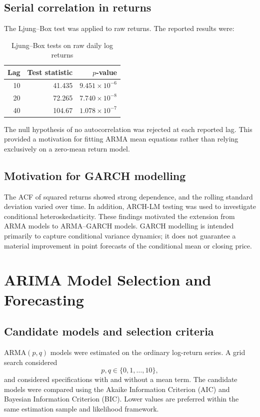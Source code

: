 \documentclass[10pt,a4paper]{article}
\begin{document}
\subsection{Serial correlation in returns}

The Ljung--Box test was applied to raw returns. The reported results were:
\begin{table}[H]
\centering
\caption{Ljung--Box tests on raw daily log returns}
\begin{tabular}{rrr}
\toprule
Lag & Test statistic & $p$-value \\
\midrule
10 & 41.435 & $9.451\times 10^{-6}$ \\
20 & 72.265 & $7.740\times 10^{-8}$ \\
40 & 104.67 & $1.078\times 10^{-7}$ \\
\bottomrule
\end{tabular}
\label{tab:raw_lb}
\end{table}

The null hypothesis of no autocorrelation was rejected at each reported lag. This provided a motivation for fitting ARMA mean equations rather than relying exclusively on a zero-mean return model.

\subsection{Motivation for GARCH modelling}

The ACF of squared returns showed strong dependence, and the rolling standard deviation varied over time. In addition, ARCH-LM testing was used to investigate conditional heteroskedasticity. These findings motivated the extension from ARMA models to ARMA--GARCH models. GARCH modelling is intended primarily to capture conditional variance dynamics; it does not guarantee a material improvement in point forecasts of the conditional mean or closing price.

\section{ARIMA Model Selection and Forecasting}

\subsection{Candidate models and selection criteria}

ARMA$(p,q)$ models were estimated on the ordinary log-return series. A grid search considered
\begin{equation}
  p,q\in\{0,1,\ldots,10\},
\end{equation}
and considered specifications with and without a mean term. The candidate models were compared using the Akaike Information Criterion (AIC) and Bayesian Information Criterion (BIC). Lower values are preferred within the same estimation sample and likelihood framework.
\end{document}
